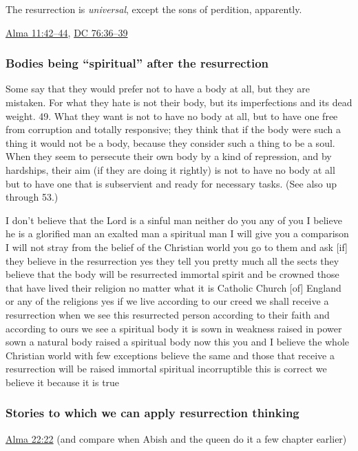 		\begin{compactitem}
			\item The resurrection is \textit{universal}, except the sons of perdition, apparently.
				\begin{compactitem}
					\item \hyperref[ALMA-11-42]{Alma 11:42--44}, \hyperref[DC76-36]{DC 76:36--39}
				\end{compactitem}
		\end{compactitem}
		
	\subsubsection{Bodies being ``spiritual'' after the resurrection}
		\label{RESURRECTION-spiritual}
		
		\begin{compactdesc}
			\item[Augustine, DDC I:48--49] Some say that they would prefer not to have a body at all, but they are mistaken. For what they hate is not their body, but its imperfections and its dead weight. 49. What they want is not to have no body at all, but to have one free from corruption and totally responsive; they think that if the body were such a thing it would not be a body, because they consider such a thing to be a soul. When they seem to persecute their own body by a kind of repression, and by hardships, their aim (if they are doing it rightly) is not to have no body at all but to have one that is subservient and ready for necessary tasks. (See also up through 53.)
			\item[{\hyperref[EMS-1865-BY-8-OCT-1865]{BY, 8 October 1865}}] I don't believe that the Lord is a sinful man neither do you any of you I believe he is a glorified man an exalted man a spiritual man I will give you a comparison I will not stray from the belief of the Christian world you go to them and ask [if] they believe in the resurrection yes they tell you pretty much all the sects they believe that the body will be resurrected immortal spirit and be crowned those that have lived their religion no matter what it is Catholic Church [of] England or any of the religions yes if we live according to our creed we shall receive a resurrection when we see this resurrected person according to their faith and according to ours we see a spiritual body it is sown in weakness raised in power sown a natural body raised a spiritual body now this you and I believe the whole Christian world with few exceptions believe the same and those that receive a resurrection will be raised immortal spiritual incorruptible this is correct we believe it because it is true 
		\end{compactdesc}
		
	\subsubsection{Stories to which we can apply resurrection thinking}
		\label{RESURRECTION-stories}
		
		\begin{compactitem}
			\item \hyperref[ALMA-22-22]{Alma 22:22} (and compare when Abish and the queen do it a few chapter earlier)
		\end{compactitem}